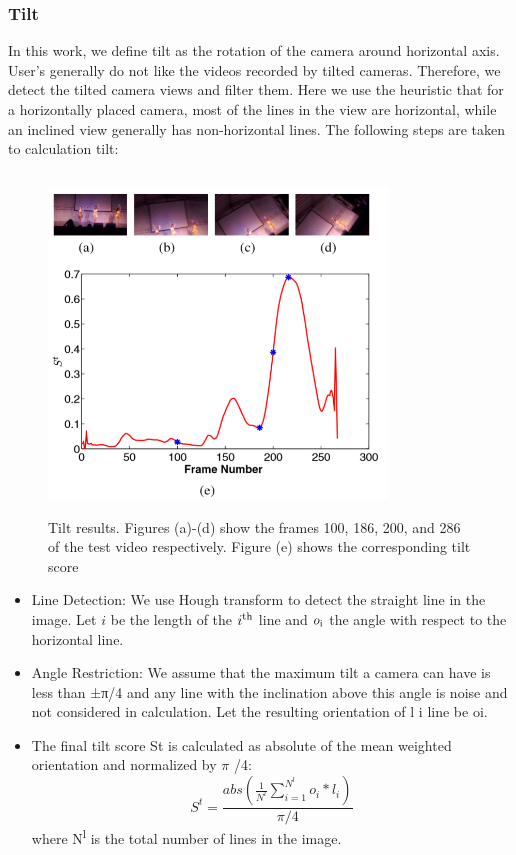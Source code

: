 \documentclass{clsfile}
\begin{document}
\subsubsection{Tilt}
In this work, we define tilt as the rotation of the camera around
horizontal axis. User’s generally do not like the videos recorded
by tilted cameras. Therefore, we detect the tilted camera views
and filter them. Here we use the heuristic that for a horizontally
placed camera, most of the lines in the view are horizontal, while
an inclined view generally has non-horizontal lines. The following
steps are taken to calculation tilt:
\begin{figure}
\includegraphics[width=9cm, height=9cm]{fig4.png}
   \caption{ Tilt results. Figures (a)-(d) show the frames 100, 186, 200, and 286 of the test video respectively. Figure (e) shows the corresponding tilt score
}

\end{figure}

\begin{itemize}

\item Line Detection: We use Hough transform to detect the straight
line in the image. Let $i$ be the length of the $i\textsuperscript{th}$ line and $o \textsubscript{i} $ the angle with respect to the horizontal line.

\item Angle Restriction: We assume that the maximum tilt a camera can have is less than ±π/4 and any line with the inclination above this angle is noise and not considered in calculation. Let the resulting orientation of l i line be oi.

\item The final tilt score St is calculated as absolute of the mean weighted orientation and normalized by $\pi$ /4:
\begin{equation}
	S^t = \frac{abs(\frac{1}{N^l}\sum_{i=1}^{N^l}o_i*l_i)}{\pi /4}
\end{equation}
where N\textsuperscript{l} is the total number of lines in the image.
\end{itemize}
\end{document}
